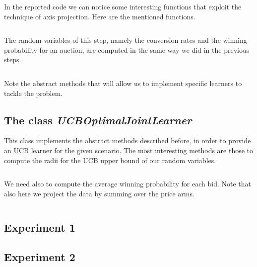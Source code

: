 \documentclass[11pt]{article} %
\begin{document}
\begin{samepage}
In the reported code we can notice some interesting functions that exploit the technique of axis projection. Here are the mentioned functions.
\inputminted{python}{code/step6_axis_projected_quantities.py}
\end{samepage}

\begin{samepage}
The random variables of this step, namely the conversion rates and the winning probability for an auction, are computed in the same way we did in the previous steps.
\inputminted{python}{code/step6_random_variables_computation.py}

Note the abstract methods that will allow us to implement specific learners to tackle the problem.
\end{samepage}

\begin{samepage}
\subsection{The class \textit{UCBOptimalJointLearner}}
This class implements the abstract methods described before, in order to provide an UCB learner for the given scenario.
The most interesting methods are those to compute the radii for the UCB upper bound of our random variables.
\inputminted{python}{code/step6_computation_radii.py}

We need also to compute the average winning probability for each bid. Note that also here we project the data by summing
over the price arms.
\inputminted{python}{code/step6_computation_winning_probability.py}
\end{samepage}

\clearpage
\subsection{Experiment 1}

\clearpage
{\footnotesize}

\clearpage
\subsection{Experiment 2}
\end{document}
